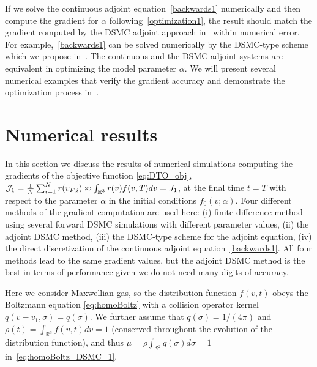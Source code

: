 \documentclass[times,final,nopreprintline]{elsarticle}
\newcommand{\bbR}{\mathbb R} \newcommand{\bbS}{\mathbb S}
\newcommand{\cS}{\mathcal S} \newcommand{\cT}{\mathcal T}
\newcommand{\Stwo}{{\cS^2}}
\begin{document}
If we solve the continuous adjoint equation~\eqref{backwards1} numerically and then compute the gradient for $\alpha$ following~\eqref{optimization1}, the result should match the gradient computed by the DSMC adjoint approach in~ within numerical error. For example,~\eqref{backwards1} can be solved numerically by the DSMC-type scheme which we propose in~. The continuous and the DSMC adjoint systems are equivalent in optimizing the model parameter $\alpha$. We will present several numerical examples that verify the gradient accuracy and demonstrate the optimization process in~.











\section{Numerical results}\label{sec:numerics}
In this section we discuss the results of numerical simulations computing the gradients of the objective function \eqref{eq:DTO_obj}, $\cJ_1 =\frac{1}{N}\sum_{i=1}^N r(v_{F,i}) \approx \int_{\bbR^3} r(v) f(v,T) dv = J_1$, at the final time $t=T$ with respect to the parameter $\alpha$ in the initial conditions $f_0(v;\alpha)$. Four different methods of the gradient computation are used here: (i) finite difference method using several forward DSMC simulations with different parameter values, (ii) the adjoint DSMC method, (iii) the DSMC-type scheme for the adjoint equation, (iv) the direct discretization of the continuous adjoint equation~\eqref{backwards1}. All four methods lead to the same gradient values, but the adjoint DSMC method is the best in terms of performance given we do not need many digits of accuracy.

Here we consider Maxwellian gas, so the distribution function $f(v,t)$ obeys the Boltzmann equation \eqref{eq:homoBoltz} with a collision operator kernel $q(v-v_1,\sigma) = q(\sigma)$. We further assume that $q(\sigma)=1/(4\pi)$ and $\rho(t)=\int_{\bbR^3} f(v,t) dv=1$ (conserved throughout the evolution of the distribution function), and thus $\mu =\rho \int_\Stwo q(\sigma)d\sigma = 1$ in~\eqref{eq:homoBoltz_DSMC_1}.
\end{document}
